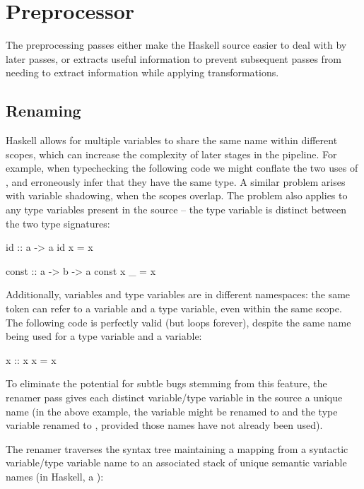 \documentclass[dissertation.tex]{subfiles}
\begin{document}
\section{Preprocessor}
{
    The preprocessing passes either make the Haskell source easier to deal with by later passes, or extracts useful information to prevent subsequent passes from needing to extract information while applying transformations.

    \subsection{Renaming}
    {
        Haskell allows for multiple variables to share the same name within different scopes, which can increase the complexity of later stages in the pipeline. For example, when typechecking the following code we might conflate the two uses of , and erroneously infer that they have the same type. A similar problem arises with variable shadowing, when the scopes overlap. The problem also applies to any type variables present in the source -- the type variable  is distinct between the two type signatures:

        \begin{haskellfigure}
        id :: a -> a
        id x = x

        const :: a -> b -> a
        const x _ = x
        \end{haskellfigure}

        Additionally, variables and type variables are in different namespaces: the same token can refer to a variable and a type variable, even within the same scope. The following code is perfectly valid (but loops forever), despite the same name being used for a type variable and a variable:

        \begin{haskellfigure}
        x :: x
        x = x
        \end{haskellfigure}

        To eliminate the potential for subtle bugs stemming from this feature, the renamer pass gives each distinct variable/type variable in the source a unique name (in the above example, the variable  might be renamed to  and the type variable renamed to , provided those names have not already been used).
        
        The renamer traverses the syntax tree maintaining a mapping from a syntactic variable/type variable name to an associated stack of unique semantic variable names (in Haskell, a ):

}}
\end{document}
